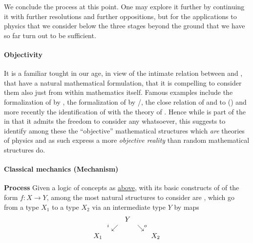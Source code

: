 \documentclass[12pt,titlepage]{article}
\def\mathllap{\mathpalette\mathllapinternal}
\def\mathrlap{\mathpalette\mathrlapinternal}
\def\mathllapinternal#1#2{\llap{$\mathsurround=0pt#1{#2}$}}
\def\mathrlapinternal#1#2{\rlap{$\mathsurround=0pt#1{#2}$}}
\newcommand{\itexarray}[1]{\begin{matrix}#1\end{matrix}}
\theoremstyle{plain}
\theoremstyle{definition}
\theoremstyle{remark}
\begin{document}
We conclude the process at this point. One may explore it further by continuing it with further resolutions and further oppositions, but for the applications to physics that we consider below the three stages beyond the ground that we have so far turn out to be sufficient.
\hypertarget{objectivity}{}\paragraph*{{Objectivity}}\label{objectivity}
It is a familiar tought in our age, in view of the intimate relation between  and , that  have a natural mathematical formulation, that it is compelling to consider them also just from within mathematics itself. Famous examples include the formalization of  by , the formalization of  by /, the close relation of  and  to  () and more recently the identification of  with the theory of .
Hence while  is part of the  in that it admits the freedom to consider any  whatsoever, this suggests to identify among these the ``objective'' mathematical structures which \emph{are} theories of physics and as such express a more \emph{objective reality} than random mathematical structures do.
\hypertarget{classical_mechanics_mechanism}{}\paragraph*{{Classical mechanics (Mechanism)}}\label{classical_mechanics_mechanism}
\textbf{Process}
Given a logic of concepts as \hyperlink{ConceptFormalization}{above}, with its basic constructs of  of the form $f \colon X \to Y$, among the most natural structures to consider are , which go from a type $X_1$ to a type $X_2$ via an intermediate type $Y$ by maps
\begin{displaymath}
\itexarray{
&& Y
\\
& {}^{\mathllap{i}}\swarrow && \searrow^{\mathrlap{o}}
\\
X_1 && && X_2
}
\end{displaymath}
\end{document}
